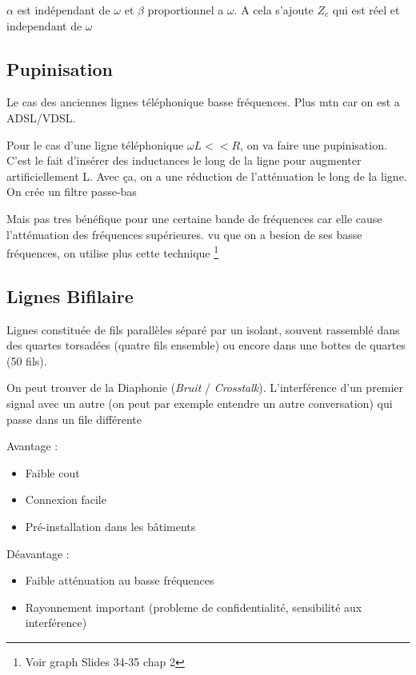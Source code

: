 			$\alpha$ est indépendant de $\omega$ et $\beta$ proportionnel a $\omega$. A cela s'ajoute $Z_c$ qui est réel et independant de $\omega$
			
						
	\subsection{Pupinisation}
	
		Le cas des anciennes lignes téléphonique basse fréquences. Plus mtn car on est a ADSL/VDSL.
		
		Pour le cas d'une ligne téléphonique $\omega L << R$, on va faire une pupinisation. C'est le fait d'insérer des inductances le long de la ligne pour augmenter artificiellement L. Avec ça, on a une réduction de l'atténuation le long de la ligne. On crée un filtre passe-bas
		
		Mais pas tres bénéfique pour une certaine bande de fréquences car elle cause l'atténuation des fréquences supérieures. vu que on a besion de ses basse fréquences, on utilise plus cette technique \footnote{Voir graph Slides 34-35 chap 2}
		
	\subsection{Lignes Bifilaire}
	
		Lignes constituée de fils parallèles séparé par un isolant, souvent rassemblé dans des quartes torsadées (quatre fils ensemble) ou encore dans une bottes de quartes (50 fils).
		
		On peut trouver de la Diaphonie (\textit{Bruit} / \textit{Crosstalk}). L'interférence d'un premier signal avec un autre (on peut par exemple entendre un autre conversation) qui passe dans un file différente
		
		Avantage :
		\begin{itemize}
			\item Faible cout
			\item Connexion facile
			\item Pré-installation dans les bâtiments
		\end{itemize}
		
		Déavantage :
		\begin{itemize}
			\item Faible atténuation au basse fréquences
			\item Rayonnement important (probleme de confidentialité, sensibilité aux interférence)

		\end{itemize}


